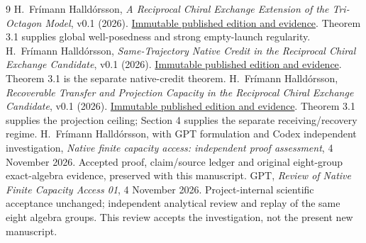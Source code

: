 \clearpage
\begin{thebibliography}{9}
H.~Fr\'imann Halld\'orsson,
\emph{A Reciprocal Chiral Exchange Extension of the Tri-Octagon Model},
v0.1 (2026).
\href{https://github.com/pzychozen/trioctagon-physics/tree/273b1a6faaab19ea58748d00576439166eeef9ab/papers/RECIPROCAL_CHIRAL_EXCHANGE/publication/v0.1}{Immutable published edition and evidence}.
Theorem 3.1 supplies global well-posedness and strong empty-launch regularity.
H.~Fr\'imann Halld\'orsson,
\emph{Same-Trajectory Native Credit in the Reciprocal Chiral Exchange Candidate},
v0.1 (2026).
\href{https://github.com/pzychozen/trioctagon-physics/tree/28e8a85c8fe1e6321328d4d7285b2560d1f98aa9/papers/SAME_TRAJECTORY_NATIVE_CREDIT/publication/v0.1}{Immutable published edition and evidence}.
Theorem 3.1 is the separate native-credit theorem.
H.~Fr\'imann Halld\'orsson,
\emph{Recoverable Transfer and Projection Capacity in the Reciprocal Chiral Exchange Candidate},
v0.1 (2026).
\href{https://github.com/pzychozen/trioctagon-physics/tree/54c0f6c419fa681e2c1e74a5ad2bb46df787bb93/papers/RECOVERABLE_TRANSFER_AND_PROJECTION_CAPACITY/publication/v0.1}{Immutable published edition and evidence}.
Theorem 3.1 supplies the projection ceiling; Section 4 supplies the separate receiving/recovery regime.
H.~Fr\'imann Halld\'orsson, with GPT formulation and Codex independent investigation,
\emph{Native finite capacity access: independent proof assessment},
4 November 2026.
Accepted proof, claim/source ledger and original eight-group exact-algebra evidence, preserved with this manuscript.
GPT, \emph{Review of Native Finite Capacity Access 01},
4 November 2026.
Project-internal scientific acceptance unchanged; independent analytical review and replay of the same eight algebra groups. This review accepts the investigation, not the present new manuscript.
\end{thebibliography}
